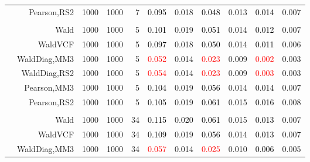 \documentclass[
]{article}
\begin{document}
\begin{table}[H]
{\begin{tabular}[t]{lrrrrrrrlrr}
\hspace{1em} & Pearson,RS2 & 1000 & 1000 & 7 & \textcolor{black}{0.095} & 0.018 & \textcolor{black}{0.048} & 0.013 & \textcolor{black}{0.014} & 0.007\\
\cmidrule{1-11}
\addlinespace[0.3em]
\multicolumn{11}{l}{\textbf{2F 10V}}\\
\hspace{1em} & Wald & 1000 & 1000 & 5 & \textcolor{black}{0.101} & 0.019 & \textcolor{black}{0.051} & 0.014 & \textcolor{black}{0.012} & 0.007\\

\hspace{1em} & WaldVCF & 1000 & 1000 & 5 & \textcolor{black}{0.097} & 0.018 & \textcolor{black}{0.050} & 0.014 & \textcolor{black}{0.011} & 0.006\\

\hspace{1em} & WaldDiag,MM3 & 1000 & 1000 & 5 & \textcolor{red}{0.052} & 0.014 & \textcolor{red}{0.023} & 0.009 & \textcolor{red}{0.002} & 0.003\\

\hspace{1em} & WaldDiag,RS2 & 1000 & 1000 & 5 & \textcolor{red}{0.054} & 0.014 & \textcolor{red}{0.023} & 0.009 & \textcolor{red}{0.003} & 0.003\\

\hspace{1em} & Pearson,MM3 & 1000 & 1000 & 5 & \textcolor{black}{0.104} & 0.019 & \textcolor{black}{0.056} & 0.014 & \textcolor{black}{0.014} & 0.007\\

\hspace{1em} & Pearson,RS2 & 1000 & 1000 & 5 & \textcolor{black}{0.105} & 0.019 & \textcolor{black}{0.061} & 0.015 & \textcolor{black}{0.016} & 0.008\\
\cmidrule{1-11}
\addlinespace[0.3em]
\multicolumn{11}{l}{\textbf{3F 15V}}\\
\hspace{1em} & Wald & 1000 & 1000 & 34 & \textcolor{black}{0.115} & 0.020 & \textcolor{black}{0.061} & 0.015 & \textcolor{black}{0.013} & 0.007\\

\hspace{1em} & WaldVCF & 1000 & 1000 & 34 & \textcolor{black}{0.109} & 0.019 & \textcolor{black}{0.056} & 0.014 & \textcolor{black}{0.013} & 0.007\\

\hspace{1em} & WaldDiag,MM3 & 1000 & 1000 & 34 & \textcolor{red}{0.057} & 0.014 & \textcolor{red}{0.025} & 0.010 & \textcolor{black}{0.006} & 0.005\\


\end{tabular}}
\end{table}
\end{document}
